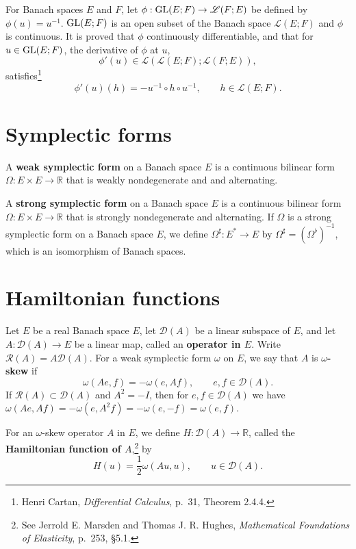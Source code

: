 \documentclass{article}
\newcommand{\GL}{\ensuremath\mathrm{GL}}
\theoremstyle{definition}
\begin{document}
For Banach spaces $E$ and $F$, 
let $\phi:\GL(E;F) \to \mathscr{L}(F;E)$ be defined by $\phi(u)=u^{-1}$. $\GL(E;F)$ is an open subset of
the Banach space $\mathscr{L}(E;F)$ and
 $\phi$ is continuous. It is proved that $\phi$ continuously differentiable, and that for $u \in \GL(E;F)$,
the derivative of $\phi$ at $u$,
\[
\phi'(u) \in \mathscr{L}(\mathscr{L}(E;F);  \mathscr{L}(F;E)),
\]
 satisfies\footnote{Henri Cartan, {\em Differential Calculus}, p.~31, Theorem 2.4.4.}
 \[
 \phi'(u)(h) = -u^{-1} \circ h \circ u^{-1}, \qquad h \in \mathscr{L}(E;F).
 \]



\section{Symplectic forms}
A \textbf{weak symplectic form} on a Banach space $E$ is a continuous bilinear form $\Omega:E \times E \to \mathbb{R}$ that is weakly nondegenerate and 
and alternating. 

A \textbf{strong symplectic form} on a Banach space $E$ is a continuous bilinear form
$\Omega:E \times E \to \mathbb{R}$ that is
strongly nondegenerate and  alternating. If $\Omega$ is a strong symplectic form on a Banach space $E$, we define
$\Omega^\sharp:E^* \to E$ by $\Omega^\sharp = (\Omega^\flat)^{-1}$, which is an isomorphism of Banach spaces.




\section{Hamiltonian functions}
Let $E$ be a  real Banach space $E$, let $\mathscr{D}(A)$ be a linear subspace of $E$, and let
$A:\mathscr{D}(A) \to E$ be a linear map, called an \textbf{operator in $E$}. Write
$\mathscr{R}(A)=A \mathscr{D}(A)$.
For a weak symplectic form $\omega$ on $E$, we say that $A$ is \textbf{$\omega$-skew} if
\[
\omega(Ae,f) = -\omega(e,Af), \qquad e,f \in \mathscr{D}(A).
\]
If $\mathscr{R}(A) \subset \mathscr{D}(A)$ and $A^2=-I$, then for $e,f \in \mathscr{D}(A)$ we have
$\omega(Ae,Af)=-\omega(e,A^2f)=-\omega(e,-f)=\omega(e,f)$. 

For an $\omega$-skew operator $A$ in $E$, we define $H:\mathscr{D}(A) \to \mathbb{R}$,
called the \textbf{Hamiltonian function of $A$},\footnote{See Jerrold E. Marsden and Thomas J. R. Hughes, {\em Mathematical Foundations of Elasticity}, p.~253, \S 5.1.}
 by
\[
H(u) = \frac{1}{2}\omega(Au,u), \qquad u \in \mathscr{D}(A).
\]
\end{document}

